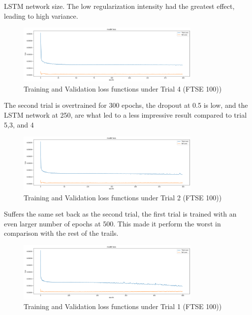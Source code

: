 \documentclass[a4paper,11pt,oneside]{book}
\begin{document}
LSTM network size. The low regularization intensity had the greatest effect, leading to high variance.\newline
\begin{figure}[!h]
	\centering
	\includegraphics[width=0.8\textwidth]{figures/FTSE4}
	\caption{Training and Validation loss functions under Trial 4 (FTSE 100))}
	\label{FTSE4}
\end{figure}
\newline The second trial is overtrained for 300 epochs, the dropout at 0.5 is low, and the LSTM network at 250, are what
led to a less impressive result compared to trial 5,3, and 4 \newline\newline\newline

\begin{figure}[!h]
	\centering
	\includegraphics[width=0.8\textwidth]{figures/FTSE2}
	\caption{Training and Validation loss functions under Trial 2 (FTSE 100))}
	\label{FTSE2}
\end{figure}

 Suffers the same set back as the second trial, the first trial is trained with an even larger number of epochs at 500. This made it
perform the worst in comparison with the rest of the trails.\newline\newline\newline
\begin{figure}[!h]
	\centering
	\includegraphics[width=0.8\textwidth]{figures/FTSE1}
	\caption{Training and Validation loss functions under Trial 1 (FTSE 100))}
	\label{FTSE1}
\end{figure}
 
\end{document}
